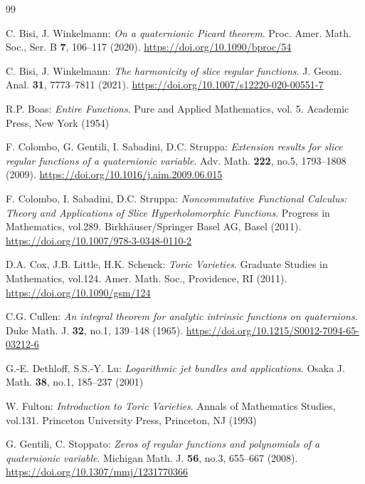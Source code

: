 \documentclass[11pt]{amsart}
\numberwithin{equation}{section}
\theoremstyle{definition}
\theoremstyle{remark}
\begin{document}
\begin{thebibliography}{99}

  C. Bisi, J. Winkelmann: \emph{On a quaternionic Picard theorem}. Proc. Amer. Math. Soc., Ser. B \textbf{7}, 106--117 (2020). \url{https://doi.org/10.1090/bproc/54}
  
  C. Bisi, J. Winkelmann: \emph{The harmonicity of slice regular functions}. J. Geom. Anal. \textbf{31}, 7773--7811 (2021). \url{https://doi.org/10.1007/s12220-020-00551-7}
  
  R.P. Boas: \emph{Entire Functions}. Pure and Applied Mathematics, vol. 5. Academic Press, New York (1954)
  
  F. Colombo, G. Gentili, I. Sabadini, D.C. Struppa: \emph{Extension results for slice regular functions of a quaternionic variable}. Adv. Math. \textbf{222}, no.5, 1793--1808 (2009). \url{https://doi.org/10.1016/j.aim.2009.06.015}
  
  F. Colombo, I. Sabadini, D.C. Struppa: \emph{Noncommutative Functional Calculus: Theory and Applications of Slice Hyperholomorphic Functions}. Progress in Mathematics, vol.289. Birkh\"auser/Springer Basel AG, Basel (2011). \url{https://doi.org/10.1007/978-3-0348-0110-2}
  
  D.A. Cox, J.B. Little, H.K. Schenck: \emph{Toric Varieties}. Graduate Studies in Mathematics, vol.124. Amer. Math. Soc., Providence, RI (2011). \url{https://doi.org/10.1090/gsm/124}
  
  C.G. Cullen: \emph{An integral theorem for analytic intrinsic functions on quaternions}. Duke Math. J. \textbf{32}, no.1, 139--148 (1965). \url{https://doi.org/10.1215/S0012-7094-65-03212-6}
  
  G.-E. Dethloff, S.S.-Y. Lu: \emph{Logarithmic jet bundles and applications}. Osaka J. Math. \textbf{38}, no.1, 185--237 (2001)
  
  W. Fulton: \emph{Introduction to Toric Varieties}. Annals of Mathematics Studies, vol.131. Princeton University Press, Princeton, NJ (1993)
  
  G. Gentili, C. Stoppato: \emph{Zeros of regular functions and polynomials of a quaternionic variable}. Michigan Math. J. \textbf{56}, no.3, 655--667 (2008). \url{https://doi.org/10.1307/mmj/1231770366}
  

\end{thebibliography}
\end{document}
